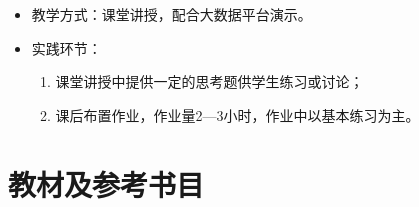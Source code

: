 \documentclass[12pt,hyperref,]{ctexart}
\begin{document}
\begin{itemize}
\item
  教学方式：课堂讲授，配合大数据平台演示。
\item
  实践环节：

  \begin{enumerate}
  \def\labelenumi{\arabic{enumi}.}
  \item
    课堂讲授中提供一定的思考题供学生练习或讨论；
  \item
    课后布置作业，作业量2---3小时，作业中以基本练习为主。
  \end{enumerate}
\end{itemize}

\section{教材及参考书目}
\end{document}
